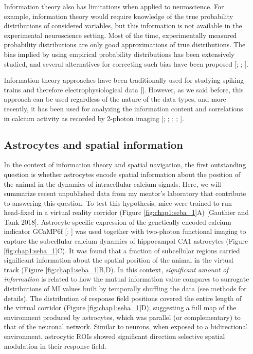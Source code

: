 Information theory also has limitations when applied to neuroscience. 
For example, information theory would require knowledge of the true probability distributions of considered variables, but this information is not available in the experimental neuroscience setting.
Most of the time, experimentally measured probability distributions are only good approximations of true distributions.
The bias implied by using empirical probability distributions has been extensively studied, and several alternatives for correcting such bias have been proposed [\cite{panzeri2007}; \cite{panzeri1996}; \cite{treves1995}].

Information theory approaches have been traditionally used for studying spiking trains and therefore electrophysiological data [\cite{skaggs1992information}].
However, as we said before, this approach can be used regardless of the nature of the data types, and more recently, it has been used for analyzing the information content and correlations in calcium activity as recorded by 2-photon imaging [\cite{shuman2020breakdown}; \cite{stefanini2020distributed}; \cite{rubin2015hippocampal}; \cite{sheintuch2017tracking}; \cite{runyan2017distinct}].
\subsection{Astrocytes and spatial information}
\label{chap1:sec:3:subsec2:astro_info}
In the context of information theory and spatial navigation, the first outstanding question is whether astrocytes encode spatial information about the position of the animal in the dynamics of intracellular calcium signals.
Here, we will summarize recent unpublished data from my mentor's laboratory that contribute to answering this question.
To test this hypothesis, mice were trained to run head-fixed in a virtual reality corridor (Figure \ref{fig:chap1:seba_1}A) [Gauthier and Tank 2018].
Astrocyte-specific expression of the genetically encoded calcium indicator GCaMP6f [\cite{chen2013}; \cite{haustein2014conditions}] was used together with two-photon functional imaging to capture the subcellular calcium dynamics of hippocampal CA1 astrocytes (Figure \ref{fig:chap1:seba_1}C). 
It was found that a fraction of subcellular regions carried significant information about the spatial position of the animal in the virtual track (Figure \ref{fig:chap1:seba_1}B,D).
In this context, \textit{significant amount of information} is related to how the mutual information value compares to surrogate distributions of MI values built by temporally shuffling the data (see methods for details). 
The distribution of response field positions covered the entire length of the virtual corridor (Figure \ref{fig:chap1:seba_1}D), suggesting a full map of the environment produced by astrocytes, which was parallel (or complementary) to that of the neuronal network.
Similar to neurons, when exposed to a bidirectional environment, astrocytic ROIs showed significant direction selective spatial modulation in their response field.

